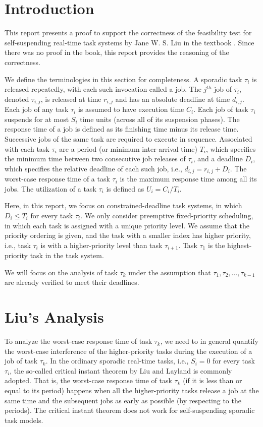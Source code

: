 \section{Introduction}

This report presents a proof to support the correctness of the feasibility test for self-suspending real-time task systems by Jane W. S. Liu in the textbook \cite{Liu:2000:RS:518501}. Since there was no proof in the book, this report provides the reasoning of the correctness.  

We define the
terminologies in this section for completeness.  A sporadic task
$\tau_i$ is released repeatedly, with each such invocation called a
job. The $j^{th}$ job of $\tau_i$, denoted $\tau_{i,j}$, is released
at time $r_{i,j}$ and has an absolute deadline at time $d_{i,j}$. Each
job of any task $\tau_i$ is assumed to have execution time $C_i$. Each job of task $\tau_i$ 
suspends for at most $S_i$ time units (across all of its suspension phases).
The response time
of a job is defined as its finishing time minus its release
time. Successive jobs of the same task are required to execute in
sequence. Associated with each task $\tau_i$ are a period (or minimum inter-arrival time) $T_i$, which
specifies the minimum time between two consecutive job releases of
$\tau_i$, and a deadline $D_i$, which specifies the relative deadline
of each such job, i.e., $d_{i,j}=r_{i,j}+D_i$. The worst-case response
time of a task $\tau_i$ is the maximum response time among all its
jobs.  The utilization of a task $\tau_i$ is defined as $U_i=C_i/T_i$.

Here, in this report, we focus on constrained-deadline task systems, in which $D_i \leq T_i$ for every task $\tau_i$. We only consider preemptive fixed-priority scheduling, in which each task is assigned with a unique priority level. We assume that the priority ordering is given, and the task with a smaller index has higher priority, i.e., task $\tau_i$ is with a higher-priority level than task $\tau_{i+1}$. Task $\tau_1$ is the highest-priority task in the task system.

We will focus on the analysis of task $\tau_k$ under the assumption that $\tau_1, \tau_2, \ldots, \tau_{k-1}$ are already verified to meet their deadlines. 

\section{Liu's Analysis}

To analyze the worst-case response time of task $\tau_k$, we need to in general quantify the worst-case interference of the higher-priority tasks during the execution of a job of task $\tau_k$. In the ordinary sporadic real-time tasks, i.e., $S_i=0$ for every task $\tau_i$, the so-called critical instant theorem by Liu and Layland \cite{Liu_1973} is commonly adopted. That is, the worst-case response time of task $\tau_k$ (if it is less than or equal to its period) happens when all the higher-priority tasks release a job at the same time and the subsequent jobs as early as possible (by respecting to the periods). The critical instant theorem does not work for self-suspending sporadic task models.  

